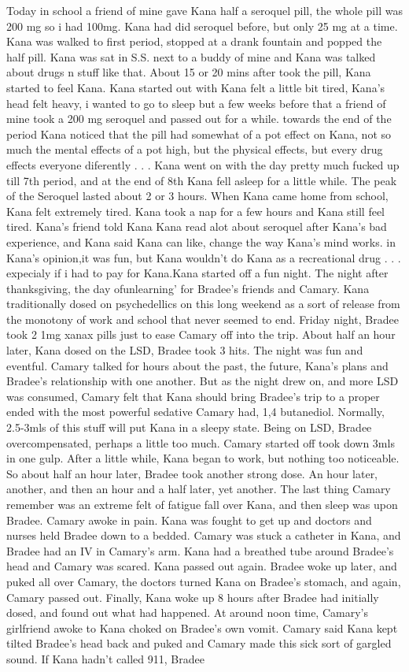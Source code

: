 \documentclass[12pt]{book}
\begin{document}
Today in school a friend of mine gave Kana half a seroquel pill, the whole pill was 200 mg so i had 100mg. Kana had did seroquel before, but only 25 mg at a time. Kana was walked to first period, stopped at a drank fountain and popped the half pill. Kana was sat in S.S. next to a buddy of mine and Kana was talked about drugs n stuff like that. About 15 or 20 mins after took the pill, Kana started to feel Kana. Kana started out with Kana felt a little bit tired, Kana's head felt heavy, i wanted to go to sleep but a few weeks before that a friend of mine took a 200 mg seroquel and passed out for a while. towards the end of the period Kana noticed that the pill had somewhat of a pot effect on Kana, not so much the mental effects of a pot high, but the physical effects, but every drug effects everyone diferently . . .  Kana went on with the day pretty much fucked up till 7th period, and at the end of 8th Kana fell asleep for a little while. The peak of the Seroquel lasted about 2 or 3 hours. When Kana came home from school, Kana felt extremely tired. Kana took a nap for a few hours and Kana still feel tired. Kana's friend told Kana Kana read alot about seroquel after Kana's bad experience, and Kana said Kana can like, change the way Kana's mind works. in Kana's opinion,it was fun, but Kana wouldn't do Kana as a recreational drug . . .  expecialy if i had to pay for Kana.Kana started off a fun night. The night after thanksgiving, the day ofunlearning' for Bradee's friends and Camary. Kana traditionally dosed on psychedellics on this long weekend as a sort of release from the monotony of work and school that never seemed to end. Friday night, Bradee took 2 1mg xanax pills just to ease Camary off into the trip. About half an hour later, Kana dosed on the LSD, Bradee took 3 hits. The night was fun and eventful. Camary talked for hours about the past, the future, Kana's plans and Bradee's relationship with one another. But as the night drew on, and more LSD was consumed, Camary felt that Kana should bring Bradee's trip to a proper ended with the most powerful sedative Camary had, 1,4 butanediol. Normally, 2.5-3mls of this stuff will put Kana in a sleepy state. Being on LSD, Bradee overcompensated, perhaps a little too much. Camary started off took down 3mls in one gulp. After a little while, Kana began to work, but nothing too noticeable. So about half an hour later, Bradee took another strong dose. An hour later, another, and then an hour and a half later, yet another. The last thing Camary remember was an extreme felt of fatigue fall over Kana, and then sleep was upon Bradee. Camary awoke in pain. Kana was fought to get up and doctors and nurses held Bradee down to a bedded. Camary was stuck a catheter in Kana, and Bradee had an IV in Camary's arm. Kana had a breathed tube around Bradee's head and Camary was scared. Kana passed out again. Bradee woke up later, and puked all over Camary, the doctors turned Kana on Bradee's stomach, and again, Camary passed out. Finally, Kana woke up 8 hours after Bradee had initially dosed, and found out what had happened. At around noon time, Camary's girlfriend awoke to Kana choked on Bradee's own vomit. Camary said Kana kept tilted Bradee's head back and puked and Camary made this sick sort of gargled sound. If Kana hadn't called 911, Bradee 
\end{document}
